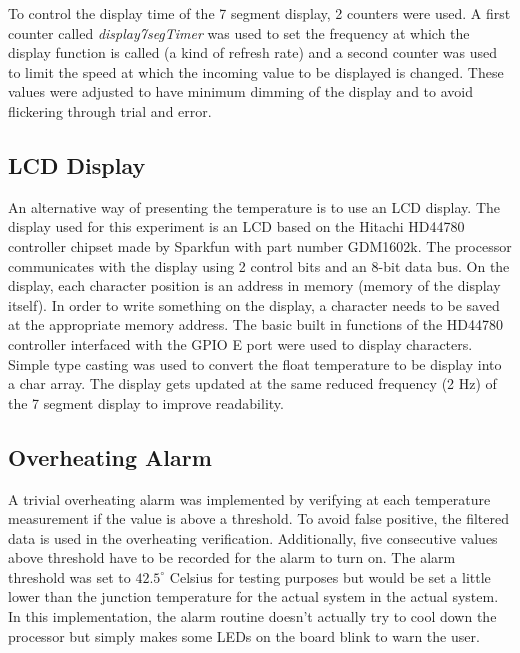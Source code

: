 \documentclass[12pt]{article}
\begin{document}
To control the display time of the 7 segment display, 2 counters were used. A first counter called \textit{display7segTimer} was used to set the frequency at which the display function is called (a kind of refresh rate) and a second counter was used to limit the speed at which the incoming value to be displayed is changed. These values were adjusted to have minimum dimming of the display and to avoid flickering through trial and error.



\subsection{LCD Display}
\label{LCD_dis}
An alternative way of presenting the temperature is to use an LCD display. The display used for this experiment is an LCD based on  the  Hitachi  HD44780  controller  chipset made by Sparkfun with part number GDM1602k. The processor communicates with the display using 2 control bits and an 8-bit data bus. On the display, each character position is an address in memory (memory of the display itself). In order to write something on the display, a character needs to be saved at the appropriate memory address. The basic built in functions of the HD44780 controller interfaced with the GPIO E port were used to display characters. Simple type casting was used to convert the float temperature to be display into a char array. The display gets updated at the same reduced frequency (2 Hz) of the 7 segment display to improve readability. 




\subsection{Overheating Alarm}
A trivial overheating alarm was implemented by verifying at each temperature measurement if the value is above a threshold. To avoid false positive, the filtered data is used in the overheating verification. Additionally, five consecutive values above threshold have to be recorded for the alarm to turn on. The alarm threshold was set to $42.5^\circ$ Celsius for testing purposes but would be set a little lower than the junction temperature for the actual system in the actual system. In this implementation, the alarm routine doesn't actually try to cool down the processor but simply makes some LEDs on the board blink to warn the user.
\end{document}

